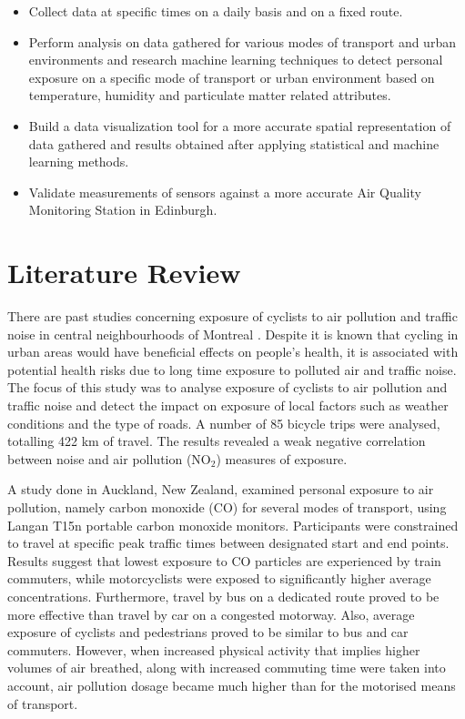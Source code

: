 \documentclass[bsc,frontabs,twoside,singlespacing, parskip,deptreport]{infthesis}     %
\begin{document}
\begin{itemize}
\item Collect data at specific times on a daily basis and on a fixed route.
\item Perform analysis on data gathered for various modes of transport and urban environments and research machine learning techniques to detect personal exposure on a specific mode of transport or urban environment based on temperature, humidity and particulate matter related attributes.
\item Build a data visualization tool for a more accurate spatial representation of data gathered and results obtained after applying statistical and machine learning methods.
\item Validate measurements of sensors against a more accurate Air Quality Monitoring Station in Edinburgh.
\end{itemize}

\section{Literature Review}
\label{sec:literature-review}

There are past studies concerning exposure of cyclists to air pollution and traffic noise in central neighbourhoods of Montreal \cite{Apparicio201663}. Despite it is known that cycling in urban areas would have beneficial effects on people's health, it is associated with potential health risks due to long time exposure to polluted air and traffic noise. The focus of this study was to analyse exposure of cyclists to air pollution and traffic noise and detect the impact on exposure of local factors such as weather conditions and the type of roads. A number of 85 bicycle trips were analysed, totalling 422 km of travel. The results revealed a weak negative correlation between noise and air pollution (NO$_2$) measures of exposure.

A study \cite{Dirks2012} done in Auckland, New Zealand, examined personal exposure to air pollution, namely carbon monoxide (CO) for several modes of transport, using Langan T15n \cite{Langan} portable carbon monoxide monitors. Participants were constrained to travel at specific peak traffic times between designated start and end points. Results suggest that lowest exposure to CO particles are experienced by train commuters, while motorcyclists were exposed to significantly higher average concentrations. Furthermore, travel by bus on a dedicated route proved to be more effective than travel by car on a congested motorway. Also, average exposure of cyclists and pedestrians proved to be similar to bus and car commuters. However, when increased physical activity that implies higher volumes of air breathed, along with increased commuting time were taken into account, air pollution dosage became much higher than for the motorised means of transport.
\end{document}
